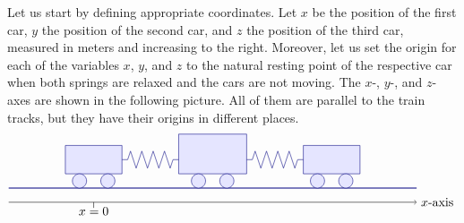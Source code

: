 \begin{solution}
  Let us start by defining appropriate coordinates.  Let $x$ be the
  position of the first car, $y$ the position of the second car, and
  $z$ the position of the third car, measured in meters and increasing
  to the right. Moreover, let us set the origin for each of the
  variables $x$, $y$, and $z$ to the natural resting point of the
  respective car when both springs are relaxed and the cars are not moving.
  The $x$-, $y$-, and $z$-axes are shown in the following picture.
  All of them are parallel to the train tracks, but they have their
  origins in different places.
  \begin{equation*}
    \begin{tikzpicture}[scale=0.8, color=blue!50!black]
      \draw[thick] (0,0) -- (14.4,0);
      \begin{scope}
        \draw[fill=blue!10] (2,0.5) rectangle (4,1.5);
        \draw[fill=blue!10] (2.5,0.25) circle (0.25);
        \draw[fill=blue!10] (3.5,0.25) circle (0.25);
      \end{scope}
      \begin{scope}[xshift=4.2cm]
        \draw[fill=blue!10] (1.8,0.5) rectangle (4.2,1.9);
        \draw[fill=blue!10] (2.5,0.25) circle (0.25);
        \draw[fill=blue!10] (3.5,0.25) circle (0.25);
      \end{scope}
      \begin{scope}[xshift=8.4cm]
        \draw[fill=blue!10] (2,0.5) rectangle (4,1.5);
        \draw[fill=blue!10] (2.5,0.25) circle (0.25);
        \draw[fill=blue!10] (3.5,0.25) circle (0.25);
      \end{scope}
      \begin{scope}[xshift=4cm]
        \draw (0,1) -- (0.2,1) -- ++(0.1,0.3)
        -- ++(0.2,-0.6) -- ++(0.2,0.6)
        -- ++(0.2,-0.6) -- ++(0.2,0.6)
        -- ++(0.2,-0.6) -- ++(0.2,0.6)
        -- ++(0.2,-0.6) -- ++(0.1,0.3)
        -- (2,1);
      \end{scope}
      \begin{scope}[xshift=8.4cm]
        \draw (0,1) -- (0.2,1) -- ++(0.1,0.3)
        -- ++(0.2,-0.6) -- ++(0.2,0.6)
        -- ++(0.2,-0.6) -- ++(0.2,0.6)
        -- ++(0.2,-0.6) -- ++(0.2,0.6)
        -- ++(0.2,-0.6) -- ++(0.1,0.3)
        -- (2,1);
      \end{scope}
      \begin{scope}[yshift=-0.5cm, color=black]
        \draw[->] (0,0) -- (14.4,0) node[right] {$x$-axis};
        \draw (3,0) -- +(0,-0.2) node[below=-4pt] {$x=0$};

\end{scope}
\end{tikzpicture}
\end{equation*}
\end{solution}
